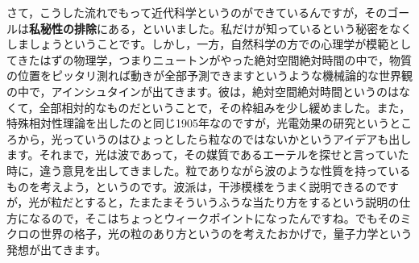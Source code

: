 \documentclass{ltjsbook}
\begin{document}
さて，こうした流れでもって近代科学というのができているんですが，そのゴールは\textbf{私秘性の排除}にある，といいました。私だけが知っているという秘密をなくしましょうということです。しかし，一方，自然科学の方での心理学が模範としてきたはずの物理学，つまりニュートンがやった絶対空間絶対時間の中で，物質の位置をピッタリ測れば動きが全部予測できますというような機械論的な世界観の中で，アインシュタインが出てきます。彼は，絶対空間絶対時間というのはなくて，全部相対的なものだということで，その枠組みを少し緩めました。また，特殊相対性理論を出したのと同じ1905年なのですが，光電効果の研究というところから，光っていうのはひょっとしたら粒なのではないかというアイデアも出します。それまで，光は波であって，その媒質であるエーテルを探せと言っていた時に，違う意見を出してきました。粒でありながら波のような性質を持っているものを考えよう，というのです。波派は，干渉模様をうまく説明できるのですが，光が粒だとすると，たまたまそういうふうな当たり方をするという説明の仕方になるので，そこはちょっとウィークポイントになったんですね。でもそのミクロの世界の格子，光の粒のあり方というのを考えたおかげで，量子力学という発想が出てきます。
\end{document}

